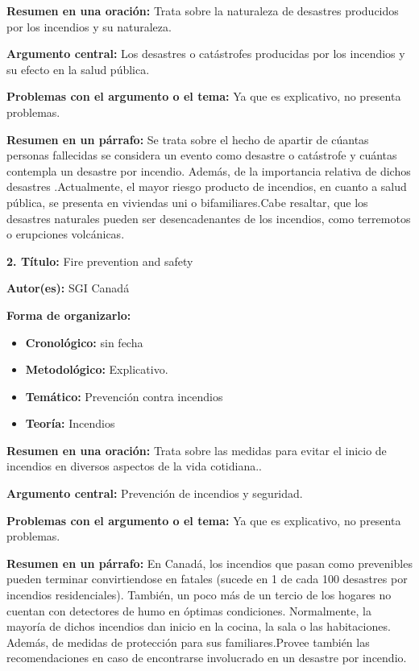 \documentclass[
  oneside]{memoir}
\begin{document}
\textbf{Resumen en una oración:} Trata sobre la naturaleza de desastres
producidos por los incendios y su naturaleza.

\textbf{Argumento central:} Los desastres o catástrofes producidas por
los incendios y su efecto en la salud pública.

\textbf{Problemas con el argumento o el tema:} Ya que es explicativo, no
presenta problemas.

\textbf{Resumen en un párrafo:} Se trata sobre el hecho de apartir de
cúantas personas fallecidas se considera un evento como desastre o
catástrofe y cuántas contempla un desastre por incendio. Además, de la
importancia relativa de dichos desastres .Actualmente, el mayor riesgo
producto de incendios, en cuanto a salud pública, se presenta en
viviendas uni o bifamiliares.Cabe resaltar, que los desastres naturales
pueden ser desencadenantes de los incendios, como terremotos o
erupciones volcánicas.

\textbf{ 2. Título:} Fire prevention and safety

\textbf{Autor(es):} SGI Canadá

\textbf{Forma de organizarlo:}

\begin{itemize}

\item \textbf{Cronológico:} sin fecha 

\item \textbf{Metodológico:} Explicativo.

\item \textbf{Temático:} Prevención contra incendios

\item \textbf{Teoría:} Incendios
\end{itemize}

\textbf{Resumen en una oración:} Trata sobre las medidas para evitar el
inicio de incendios en diversos aspectos de la vida cotidiana..

\textbf{Argumento central:} Prevención de incendios y seguridad.

\textbf{Problemas con el argumento o el tema:} Ya que es explicativo, no
presenta problemas.

\textbf{Resumen en un párrafo:} En Canadá, los incendios que pasan como
prevenibles pueden terminar convirtiendose en fatales (sucede en 1 de
cada 100 desastres por incendios residenciales). También, un poco más de
un tercio de los hogares no cuentan con detectores de humo en óptimas
condiciones. Normalmente, la mayoría de dichos incendios dan inicio en
la cocina, la sala o las habitaciones. Además, de medidas de protección
para sus familiares.Provee también las recomendaciones en caso de
encontrarse involucrado en un desastre por incendio.
\end{document}
